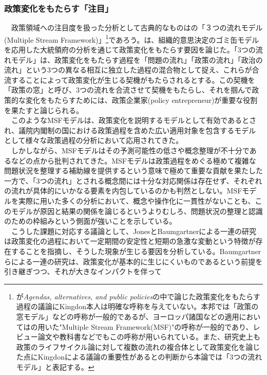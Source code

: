 \subsubsection{政策変化をもたらす「注目」}
　政策領域への注目度を扱った分析として古典的なものは\citet*{Kingdon1984-oq}の「３つの流れモデル(Multiple Stream Framework)」\footnote{\citet*{Kingdon1984-oq}が\textit{Agendas, alternatives, and public policies}の中で論じた政策変化をもたらす過程の議論にKingdon本人は明確な呼称を与えていない。本邦では「政策の窓モデル」などの呼称が一般的であるが、ヨーロッパ諸国などの適用においては\citet*{Zahariadis2003-ck}の用いた"Multiple Stream Framework(MSF)"の呼称が一般的であり、レビュー論文や教科書などでもこの呼称が用いられている。また、研究史上も政策のライフサイクル論に対して複数の流れの複合体として政策変化を論じた点にKingdonによる議論の重要性があるとの判断から本論では「3つの流れモデル」と表記する。}であろう。\citet*{Kingdon1984-oq, Kingdon2013-ac}は、組織的意思決定のゴミ缶モデル\citep*{Cohen1972-ym}を応用した大統領府の分析を通じて政策変化をもたらす要因を論じた。「3つの流れモデル」は、政策変化をもたらす過程を「問題の流れ」「政策の流れ」「政治の流れ」という3つの異なる相互に独立した過程の混合物として捉え、これらが合流することによって政策変化が生じる契機がもたらされるとする。この契機を「政策の窓」と呼び、3つの流れを合流させて契機をもたらし、それを掴んで政策的な変化をもたらすためには、政策企業家(policy entrepreneur)が重要な役割を果たすと論じられる。\citep*{Kingdon1984-oq,Kingdon2013-ac}\\
　このようなMSFモデルは、政策変化を説明するモデルとして有効であるとされ、議院内閣制の国における政策過程を含めた広い適用対象を包含するモデルとして様々な政策過程の分析において応用されてきた。\citep*{Rawat2016-ew,Jones2016-lc}\\
　しかしながら、MSFモデルはその予測可能性の低さ\citep*{}や概念整理が不十分である\citep*{John2018-im}などの点から批判されてきた。MSFモデルは政策過程をめぐる極めて複雑な問題状況を整理する補助線を提供するという意味で極めて重要な貢献を果たした一方で、「3つの流れ」とされる概念間には十分な対応関係は存在せず、それぞれの流れが具体的にいかなる要素を内包しているのかも判然としない。MSFモデルを実際に用いた多くの分析において、概念や操作化に一貫性がない\citep*{Jones2016-lc}ことも、このモデルが原因と結果の関係を論じるというよりむしろ、問題状況の整理と認識のための枠組みという側面が強いことを示している。\\
　こうした課題に対応する議論として、JonesとBaumgartnerによる一連の研究\citep*{Baumgartner2010-rl,Baumgartner2020-ee, Baumgartner2009-eb}は政策変化の過程において一定期間の安定性と短期の急激な変動という特徴が存在することを指摘し、そうした現象が生じる要因を分析している。Baumgartnerらによる一連の研究は、政策変化が基本的に生じにくいものであるという前提を引き継ぎつつ、それが大きなインパクトを伴って\\

